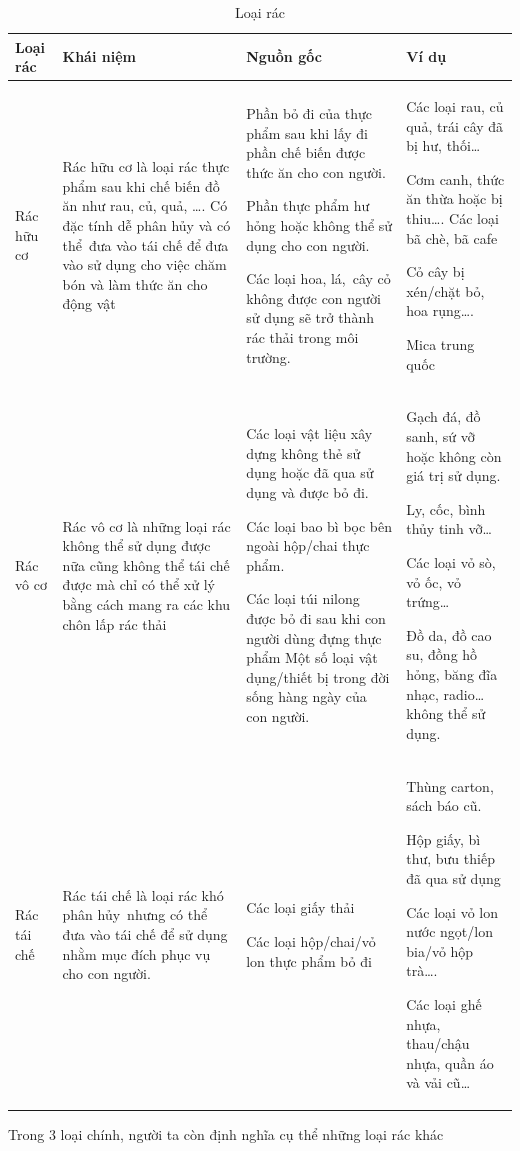 \begin{table}[h]
    \caption{Loại rác} 
    \label{tab.garbage.type}
    \begin{tabular}{| m{4em} | m{4cm} | m{4cm} | m{4cm} |}
        \hline
        Loại rác & Khái niệm & Nguồn gốc & Ví dụ \\
        \hline
        Rác hữu cơ &Rác hữu cơ là loại rác thực phẩm sau khi chế biến đồ ăn như rau, củ, quả, …. Có đặc tính dễ phân hủy và có thể đưa vào tái chế để đưa vào sử dụng cho việc chăm bón và làm thức ăn cho động vật
        &
        Phần bỏ đi của thực phẩm sau khi lấy đi phần chế biến được thức ăn cho con người.
         
         
         Phần thực phẩm hư hỏng hoặc không thể sử dụng cho con người.

        Các loại hoa, lá, cây cỏ không được con người sử dụng sẽ trở thành rác thải trong môi trường.& 
         Các loại rau, củ quả, trái cây đã bị hư, thối…

        Cơm canh, thức ăn thừa hoặc bị thiu…. Các loại bã chè, bã cafe
       
         Cỏ cây bị xén/chặt bỏ, hoa rụng….
        
         Mica trung quốc\\
         
        
        \hline
        Rác vô cơ &
        Rác vô cơ là những loại rác không thể sử dụng được nữa cũng không thể tái chế được mà chỉ có thể xử lý bằng cách mang ra các khu chôn lấp rác thải
        &
        Các loại vật liệu xây dựng không thẻ sử dụng hoặc đã qua sử dụng và được bỏ đi.

        Các loại bao bì bọc bên ngoài hộp/chai thực phẩm.

        Các loại túi nilong được bỏ đi sau khi con người dùng đựng thực phẩm
        Một số loại vật dụng/thiết bị trong đời sống hàng ngày của con người.
        &
         Gạch đá, đồ sanh, sứ vỡ hoặc không còn giá trị sử dụng.

         Ly, cốc, bình thủy tinh vỡ…

         Các loại vỏ sò, vỏ ốc, vỏ trứng…

         Đồ da, đồ cao su, đồng hồ hỏng, băng đĩa nhạc, radio… không thể sử dụng.\\

        \hline
        Rác tái chế
        &Rác tái chế là loại rác khó phân hủy nhưng có thể đưa vào tái chế để sử dụng nhằm mục đích phục vụ cho con người.
        & Các loại giấy thải

         Các loại hộp/chai/vỏ lon thực phẩm bỏ đi
        & Thùng carton, sách báo cũ.

         Hộp giấy, bì thư, bưu thiếp đã qua sử dụng

         Các loại vỏ lon nước ngọt/lon bia/vỏ hộp trà….

         Các loại ghế nhựa, thau/chậu nhựa, quần áo và vải cũ…\\
        
        \hline
    \end{tabular}
\end{table}
Trong 3 loại chính, người ta còn định nghĩa cụ thể những loại rác khác



